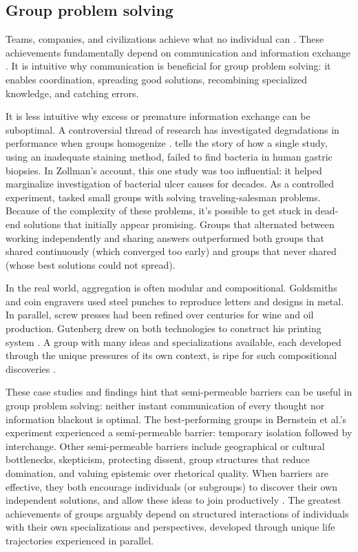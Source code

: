 \documentclass[11pt]{article}
\begin{document}
\subsection*{Group problem solving}

Teams, companies, and civilizations achieve what no individual can \citep{henrich2016secret, hutchins1995cognition}. These achievements fundamentally depend on communication and information exchange \citep{sawyer2017group, mesmermagnus2009information}. It is intuitive why communication is beneficial for group problem solving: it enables coordination, spreading good solutions, recombining specialized knowledge, and catching errors. 

It is less intuitive why excess or premature information exchange can be suboptimal. A controversial thread of research has investigated degradations in performance when groups homogenize \citep{lazer2007network, frey2021social, janis1972victims}. \cite{zollman2010epistemic} tells the story of how a single study, using an inadequate staining method, failed to find bacteria in human gastric biopsies. In Zollman's account, this one study was too influential: it helped marginalize investigation of bacterial ulcer causes for decades. As a controlled experiment, \cite{bernstein2018intermittent} tasked small groups with solving traveling-salesman problems. Because of the complexity of these problems, it's possible to get stuck in dead-end solutions that initially appear promising. Groups that alternated between working independently and sharing answers outperformed both groups that shared continuously (which converged too early) and groups that never shared (whose best solutions could not spread).



In the real world, aggregation is often modular and compositional. Goldsmiths and coin engravers used steel punches to reproduce letters and designs in metal. In parallel, screw presses had been refined over centuries for wine and oil production. Gutenberg drew on both technologies to construct his printing system \citep{johnson2010where}. A group with many ideas and specializations available, each developed through the unique pressures of its own context, is ripe for such compositional discoveries \citep{derex2016partial}.

These case studies and findings hint that semi-permeable barriers can be useful in group problem solving: neither instant communication of every thought nor information blackout is optimal. The best-performing groups in Bernstein et al.'s experiment experienced a semi-permeable barrier: temporary isolation followed by interchange. Other semi-permeable barriers include geographical or cultural bottlenecks, skepticism, protecting dissent, group structures that reduce domination, and valuing epistemic over rhetorical quality. When barriers are effective, they both encourage individuals (or subgroups) to discover their own independent solutions, and allow these ideas to join productively \citep{surowiecki2005wisdom}. The greatest achievements of groups arguably depend on structured interactions of individuals with their own specializations and perspectives, developed through unique life trajectories experienced in parallel. 
\end{document}
